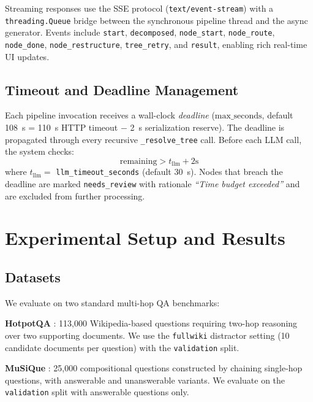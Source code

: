 \documentclass[conference]{IEEEtran}
\begin{document}
Streaming responses use the SSE protocol (\texttt{text/event-stream})
with a \texttt{threading.Queue} bridge between the synchronous pipeline
thread and the async generator.  Events include \texttt{start},
\texttt{decomposed}, \texttt{node\_start}, \texttt{node\_route},
\texttt{node\_done}, \texttt{node\_restructure}, \texttt{tree\_retry},
and \texttt{result}, enabling rich real-time UI updates.

\subsection{Timeout and Deadline Management}

Each pipeline invocation receives a wall-clock \emph{deadline}
($\text{max\_seconds}$, default 108~s = 110~s HTTP timeout $-$ 2~s
serialization reserve).  The deadline is propagated through every
recursive \texttt{\_resolve\_tree} call.  Before each LLM call,
the system checks:
\begin{equation}
  \text{remaining} > t_{\text{llm}} + 2\text{s}
  \label{eq:deadline}
\end{equation}
where $t_{\text{llm}} = $ \texttt{llm\_timeout\_seconds} (default 30~s).
Nodes that breach the deadline are marked \texttt{needs\_review} with
rationale \textit{``Time budget exceeded''} and are excluded from
further processing.

\section{Experimental Setup and Results}
\label{sec:eval}

\subsection{Datasets}

We evaluate on two standard multi-hop QA benchmarks:

\textbf{HotpotQA} \cite{yang2018hotpotqa}: 113,000 Wikipedia-based
questions requiring two-hop reasoning over two supporting documents.
We use the \texttt{fullwiki} distractor setting (10 candidate documents
per question) with the \texttt{validation} split.

\textbf{MuSiQue} \cite{trivedi2022musique}: 25,000 compositional
questions constructed by chaining single-hop questions, with answerable
and unanswerable variants.  We evaluate on the \texttt{validation}
split with answerable questions only.
\end{document}

